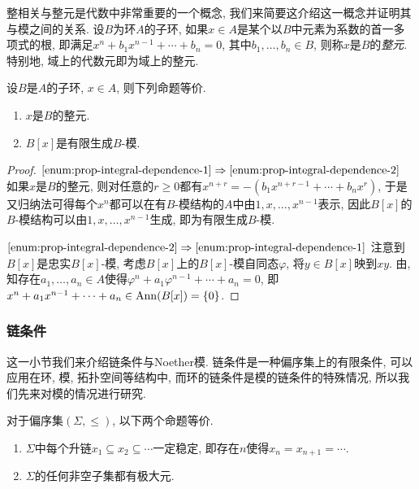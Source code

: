 整相关与整元是代数中非常重要的一个概念, 我们来简要这介绍这一概念并证明其与模之间的关系. 设$B$为环$A$的子环, 如果$x\in A$是某个以$B$中元素为系数的首一多项式的根, 即满足$x^n+b_1x^{n-1}+\dotsb +b_n=0$, 其中$b_1, \dotsc, b_n\in B$, 则称$x$是$B$的\emph{整元}. 特别地, 域上的代数元即为域上的整元.

\begin{proposition}\label{prop:integraldependence}
  设$B$是$A$的子环, $x\in A$, 则下列命题等价.
  \begin{enumerate}
    \item\label{enum:prop-integral-dependence-1} $x$是$B$的整元.
    \item\label{enum:prop-integral-dependence-2} $B[x]$是有限生成$B$-模.
  \end{enumerate}
\end{proposition}

\begin{proof}
  $\ref{enum:prop-integral-dependence-1}\Rightarrow\ref{enum:prop-integral-dependence-2}$ 如果$x$是$B$的整元, 则对任意的$r\geq 0$都有$x^{n+r}=-(b_1x^{n+r-1}+\dotsb +b_nx^r)$, 于是又归纳法可得每个$x^n$都可以在有$B$-模结构的$A$中由$1, x, \dotsc, x^{n-1}$表示, 因此$B[x]$的$B$-模结构可以由$1, x, \dotsc, x^{n-1}$生成, 即为有限生成$B$-模.

  $\ref{enum:prop-integral-dependence-2}\Rightarrow\ref{enum:prop-integral-dependence-1}$ 注意到$B[x]$是忠实$B[x]$-模, 考虑$B[x]$上的$B[x]$-模自同态$\varphi$, 将$y\in B[x]$映到$xy$. 由, 知存在$a_1, \dotsc, a_n\in A$使得$\varphi^n +a_1\varphi^{n-1}+\dotsb +a_n=0$, 即$x^n +a_1x^{n-1}+\dotsb +a_n\in \operatorname{Ann} (B[x])=\{0\}$.
\end{proof}


\subsubsection{链条件}

这一小节我们来介绍链条件与Noether模. 链条件是一种偏序集上的有限条件, 可以应用在环, 模, 拓扑空间等结构中, 而环的链条件是模的链条件的特殊情况, 所以我们先来对模的情况进行研究.

\begin{proposition}\label{prop:chaincondition}
  对于偏序集$(\Sigma, \leq)$, 以下两个命题等价.
  \begin{enumerate}
    \item\label{enum:prop-chain-condition-chain} $\Sigma$中每个升链$x_1\subseteq x_2\subseteq\dotsb$一定稳定, 即存在$n$使得$x_n=x_{n+1}=\dotsb$.
    \item\label{enum:prop-chain-condition-maximal} $\Sigma$的任何非空子集都有极大元.
  \end{enumerate}
\end{proposition}

